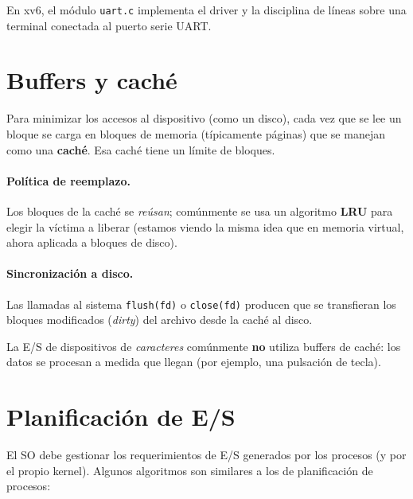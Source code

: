 \documentclass[11pt,a4paper]{article}
\begin{document}
\begin{idea}
En xv6, el módulo \texttt{uart.c} implementa el driver y la disciplina
de líneas sobre una terminal conectada al puerto serie UART.
\end{idea}

\section{Buffers y caché}

Para minimizar los accesos al dispositivo (como un disco), cada vez que
se lee un bloque se carga en bloques de memoria (típicamente páginas)
que se manejan como una \textbf{caché}. Esa caché tiene un límite de
bloques.

\paragraph{Política de reemplazo.}
Los bloques de la caché se \emph{reúsan}; comúnmente se usa un
algoritmo \textbf{LRU} para elegir la víctima a liberar (estamos viendo
la misma idea que en memoria virtual, ahora aplicada a bloques de
disco).

\paragraph{Sincronización a disco.}
Las llamadas al sistema \verb|flush(fd)| o \verb|close(fd)| producen
que se transfieran los bloques modificados (\emph{dirty}) del archivo
desde la caché al disco.

\begin{importante}
La E/S de dispositivos de \emph{caracteres} comúnmente \textbf{no}
utiliza buffers de caché: los datos se procesan a medida que llegan
(por ejemplo, una pulsación de tecla).
\end{importante}

\section{Planificación de E/S}

El SO debe gestionar los requerimientos de E/S generados por los
procesos (y por el propio kernel). Algunos algoritmos son similares a
los de planificación de procesos:
\end{document}
